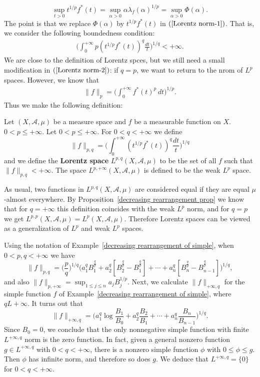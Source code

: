 \[\sup_{t>0}t^{1/p}f^*(t)=\sup_{\alpha>0}\alpha\lambda_f(\alpha)^{1/p}=\sup_{\alpha>0}\Phi(\alpha).\]
The point is that we replace $\Phi(\alpha)$ by $t^{1/p}f^*(t)$ in $(\ref{Lorentz norm-1})$. That is, we consider the following boundedness condition:
\begin{align}\label{Lorentz norm-2}
\Big(\int_{0}^{+\infty}p(t^{1/p}f^*(t))^q\frac{dt}{t}\Big)^{1/q}<+\infty.
\end{align}
We are close to the definition of Lorentz spces, but we still need a small modification in $(\ref{Lorentz norm-2})$: if $q=p$, we want to return to the nrom of $L^p$ spaces. However, we know that
\begin{align}\label{Lorentz norm-3}
\|f\|_p=\Big(\int_{0}^{+\infty}f^*(t)^p\,dt\Big)^{1/p}.
\end{align}
Thus we make the following definition:
\begin{definition}
Let $(X,\mathcal{A},\mu)$ be a measure space and $f$ be a measurable function on $X$. $0<p\leq+\infty$. Let $0<p\leq+\infty$. For $0<q<+\infty$ we define
\[\|f\|_{p,q}=\Big(\int_{0}^{+\infty}(t^{1/p}f^*(t))^q\frac{dt}{t}\Big)^{1/q}\]
and we define the \textbf{Lorentz space} $L^{p,q}(X,\mathcal{A},\mu)$ to be the set of all $f$ such that $\|f\|_{p,q}<+\infty$. The space $L^{p,+\infty}(X,\mathcal{A},\mu)$ is defined to be the weak $L^p$ space. 
\end{definition}
As usual, two functions in $L^{p,q}(X,\mathcal{A},\mu)$ are considered equal if they are equal $\mu$-almost everywhere. By Proposition~\ref{decreasing rearrangement prop} we know that for $q=+\infty$ this definition coincides with the weak $L^p$ norm, and for $q=p$ we get $L^{p,p}(X,\mathcal{A},\mu)=L^p(X,\mathcal{A},\mu)$. Therefore Lorentz spaces can be viewed as a generalization of $L^p$ and weak $L^p$ spaces.
\begin{example}\label{L^pq norm for simple}
Using the notation of Example~\ref{decreasing rearrangement of simple}, when $0<p,q<+\infty$ we have
\[\|f\|_{p,q}=\Big(\frac{p}{q}\Big)^{1/q}\Big(a_1^qB_1^{\frac{q}{p}}+a_2^q[B_2^{\frac{q}{p}}-B_1^{\frac{q}{p}}]+\cdots+a_n^q[B_n^{\frac{q}{p}}-B_{n-1}^{\frac{q}{p}}]\Big)^{1/q},\]
and also $\|f\|_{p,+\infty}=\sup_{1\leq j\leq n}a_jB_j^{1/p}$. Next, we calculate $\|f\|_{+\infty,q}$ for the simple function $f$ of Example~\ref{decreasing rearrangement of simple}, where $qL+\infty$. It turns out that
\[\|f\|_{+\infty,q}=\Big(a_1^q\log\frac{B_1}{B_0}+a_2^q\frac{B_2}{B_1}+\cdots+a_n^q\frac{B_n}{B_{n-1}}\Big)^{1/q}.\]
Since $B_0=0$, we conclude that the only nonnegative simple function with finite $L^{+\infty,q}$ norm is the zero function. In fact, given a general nonzero function $g\in L^{+\infty,q}$ with $0<q<+\infty$, there is a nonzero simple function $\phi$ with $0\leq\phi\leq g$. Then $\phi$ has infinite norm, and therefore so does $g$. We deduce that $L^{+\infty,q}=\{0\}$ for $0<q<+\infty$.
\end{example}
